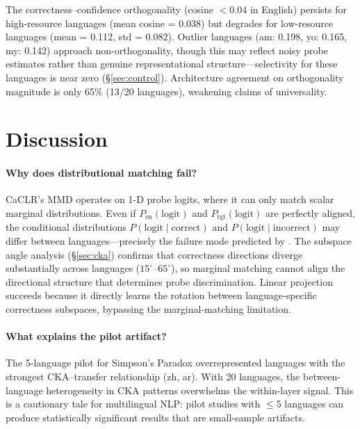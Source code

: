 \documentclass[11pt,a4paper]{article}
\begin{document}
The correctness--confidence orthogonality (cosine $< 0.04$ in English) persists for high-resource languages (mean cosine = 0.038) but degrades for low-resource languages (mean = 0.112, std = 0.082).
Outlier languages (am: 0.198, yo: 0.165, my: 0.142) approach non-orthogonality, though this may reflect noisy probe estimates rather than genuine representational structure---selectivity for these languages is near zero (\S\ref{sec:control}).
Architecture agreement on orthogonality magnitude is only 65\% (13/20 languages), weakening claims of universality.

\section{Discussion}
\label{sec:discussion}

\paragraph{Why does distributional matching fail?}
CaCLR's MMD operates on 1-D probe logits, where it can only match scalar marginal distributions.
Even if $P_{\text{en}}(\text{logit})$ and $P_{\text{tgt}}(\text{logit})$ are perfectly aligned, the conditional distributions $P(\text{logit} \mid \text{correct})$ and $P(\text{logit} \mid \text{incorrect})$ may differ between languages---precisely the failure mode predicted by \citet{}.
The subspace angle analysis (\S\ref{sec:cka}) confirms that correctness directions diverge substantially across languages ($15^\circ$--$65^\circ$), so marginal matching cannot align the directional structure that determines probe discrimination.
Linear projection succeeds because it directly learns the rotation between language-specific correctness subspaces, bypassing the marginal-matching limitation.

\paragraph{What explains the pilot artifact?}
The 5-language pilot for Simpson's Paradox overrepresented languages with the strongest CKA--transfer relationship (zh, ar).
With 20 languages, the between-language heterogeneity in CKA patterns overwhelms the within-layer signal.
This is a cautionary tale for multilingual NLP: pilot studies with $\leq$5 languages can produce statistically significant results that are small-sample artifacts.
\end{document}
